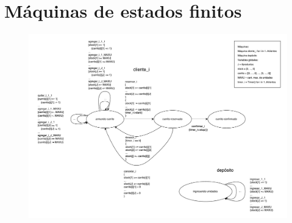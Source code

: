\section{Máquinas de estados finitos}

\begin{figure}[H]
  \begin{center}
  \includegraphics[angle=90,height=\textheight]{images/fsm.pdf}
  \end{center}
\end{figure}
